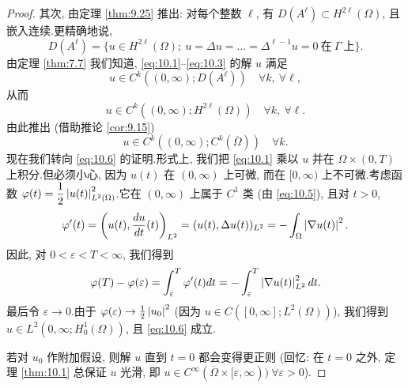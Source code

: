 \begin{proof}
其次, 由定理  \ref{thm:9.25} 推出: 对每个整数 $\ell$, 有
$D(A^\ell)\subset H^{2\ell}(\Omega)$, 且嵌入连续.更精确地说,
\begin{equation*}
D(A^\ell)=\{u\in H^{2\ell}(\Omega);\ u=\Delta u=\dots=\Delta^{\ell-1}u=0
\ \text{在}\ \Gamma\ \text{上}\}.
\end{equation*}
由定理  \ref{thm:7.7} 我们知道, \eqref{eq:10.1}--\eqref{eq:10.3} 的解 $u$
满足
\begin{equation*}
u\in C^k((0,\infty);D(A^\ell))\quad\forall k,\ \forall\ell,
\end{equation*}
从而
\begin{equation*}
u\in C^k((0,\infty);H^{2\ell}(\Omega))\quad\forall k,\ \forall\ell.
\end{equation*}
由此推出 (借助推论  \ref{cor:9.15})
\begin{equation*}
u\in C^k((0,\infty);C^k(\overline\Omega))\quad\forall k.
\end{equation*}
现在我们转向 \eqref{eq:10.6} 的证明.形式上, 我们把 \eqref{eq:10.1} 乘以
$u$ 并在 $\Omega\times(0,T)$ 上积分.但必须小心, 因为 $u(t)$ 在 $(0,\infty)$
上可微, 而在 $[0,\infty)$ 上不可微.考虑函数
$\varphi(t)=\dfrac12\left|u(t)\right|^2_{L^2(\Omega)}$.它在 $(0,\infty)$ 上属于
$C^1$ 类 (由 \eqref{eq:10.5}), 且对 $t>0$,
\begin{equation*}
\varphi'(t)=\left(u(t),\frac{du}{dt}(t)\right)_{L^2}
=(u(t),\Delta u(t))_{L^2}=-\int_\Omega\left|\nabla u(t)\right|^2.
\end{equation*}
因此, 对 $0<\varepsilon<T<\infty$, 我们得到
\begin{equation*}
\varphi(T)-\varphi(\varepsilon)
=\int_\varepsilon^T\varphi'(t)dt
=-\int_\varepsilon^T\left|\nabla u(t)\right|^2_{L^2}dt.
\end{equation*}
最后令 $\varepsilon\to0$.由于 $\varphi(\varepsilon)\to\frac12\left|u_0\right|^2$
(因为 $u\in C([0,\infty];L^2(\Omega))$), 我们得到
$u\in L^2(0,\infty;H_0^1(\Omega))$, 且 \eqref{eq:10.6} 成立.

若对 $u_0$ 作附加假设, 则解 $u$ 直到 $t=0$ 都会变得更正则 (回忆: 在
$t=0$ 之外, 定理  \ref{thm:10.1} 总保证 $u$ 光滑, 即
$u\in C^\infty(\overline\Omega\times[\varepsilon,\infty))\ \forall\varepsilon>0$).
\end{proof}

